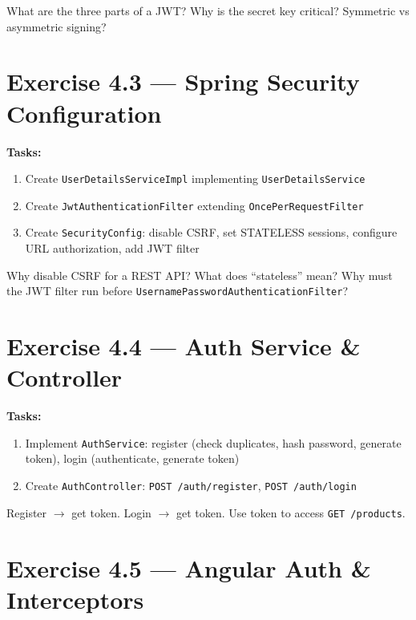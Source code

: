 \documentclass[12pt,a4paper]{report}
\begin{document}
\begin{thinkbox}
What are the three parts of a JWT? Why is the secret key critical? Symmetric vs asymmetric signing?
\end{thinkbox}

\section{Exercise 4.3 --- Spring Security Configuration}

\textbf{Tasks:}
\begin{enumerate}
    \item Create \texttt{UserDetailsServiceImpl} implementing \texttt{UserDetailsService}
    \item Create \texttt{JwtAuthenticationFilter} extending \texttt{OncePerRequestFilter}
    \item Create \texttt{SecurityConfig}: disable CSRF, set STATELESS sessions, configure URL authorization, add JWT filter
\end{enumerate}

\begin{thinkbox}
Why disable CSRF for a REST API? What does ``stateless'' mean? Why must the JWT filter run before \texttt{UsernamePasswordAuthenticationFilter}?
\end{thinkbox}

\section{Exercise 4.4 --- Auth Service \& Controller}

\textbf{Tasks:}
\begin{enumerate}
    \item Implement \texttt{AuthService}: register (check duplicates, hash password, generate token), login (authenticate, generate token)
    \item Create \texttt{AuthController}: \texttt{POST /auth/register}, \texttt{POST /auth/login}
\end{enumerate}

\begin{checkpoint}
Register $\to$ get token. Login $\to$ get token. Use token to access \texttt{GET /products}.
\end{checkpoint}

\section{Exercise 4.5 --- Angular Auth \& Interceptors}
\end{document}
